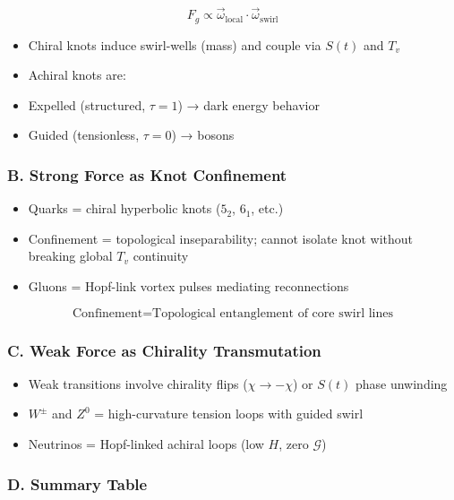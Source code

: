 \documentclass[12pt]{article}
\begin{document}
\[
F_g \propto \vec{\omega}_{\text{local}} \cdot \vec{\omega}_{\text{swirl}}
\]

\begin{itemize}
    \item Chiral knots induce swirl-wells (mass) and couple via $S(t)$ and $T_v$
    \item Achiral knots are:
    \item Expelled (structured, $\tau=1$) → dark energy behavior
    \item Guided (tensionless, $\tau=0$) → bosons
\end{itemize}

\subsubsection*{B. Strong Force as Knot Confinement}

\begin{itemize}
    \item Quarks = chiral hyperbolic knots ($5_2$, $6_1$, etc.)
    \item Confinement = topological inseparability; cannot isolate knot without breaking global $T_v$ continuity
    \item Gluons = Hopf-link vortex pulses mediating reconnections
\end{itemize}

\[
\text{Confinement} = \text{Topological entanglement of core swirl lines}
\]

\subsubsection*{C. Weak Force as Chirality Transmutation}

\begin{itemize}
    \item Weak transitions involve chirality flips ($\chi \to -\chi$) or $S(t)$ phase unwinding
    \item $W^\pm$ and $Z^0$ = high-curvature tension loops with guided swirl
    \item Neutrinos = Hopf-linked achiral loops (low $H$, zero $\mathcal{G}$)
\end{itemize}

\subsubsection*{D. Summary Table}
\end{document}
